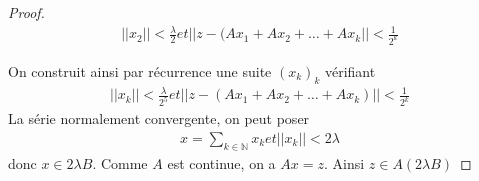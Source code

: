 \documentclass{report}
\begin{document}
{\begin{proof}
	\begin{align*}
			||x_2|| < \frac{\lambda}{2} et ||z - (A x_1 + A x_2 + \ldots + A x_k|| < \frac{1}{2^k}	
	\end{align*}

On construit ainsi par récurrence une suite $(x_k)_k$ vérifiant		
	\begin{align*}
		||x_k|| < \frac{\lambda}{2^5} et ||z - (A x_1 + A x_2 + \ldots + A x_k)|| < \frac{1}{2^k}
	\end{align*}
La série normalement convergente, on peut poser		
	\begin{align*}
		x = \sum_{k \in \mathbb{N}} x_k et ||x_k|| < 2 \lambda	
	\end{align*}
donc $x \in 2 \lambda B$. Comme $A$ est continue, on a $A x = z$. Ainsi $z \in A(2 \lambda B)$	
\end{proof}



}
\end{document}
